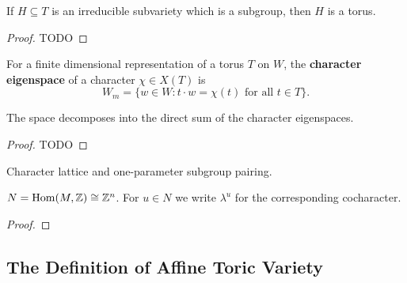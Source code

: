 \begin{proposition}[Proposition 1.1.1(b)]
  \label{1-1-1-subgroup-subtorus}

  If $H \subseteq T$ is an irreducible subvariety which is a subgroup, then $H$ is a torus.
\end{proposition}
\begin{proof}
  \uses{}

  TODO
\end{proof}


\begin{definition}
  \label{1-1-char-eigenspace}

  For a finite dimensional representation of a torus $T$ on $W$, the {\bf character eigenspace} of a character $\chi \in X(T)$ is
  \[
    W_m = \{w\in W : t\cdot w = \chi(t)\text{ for all } t\in T \}.
  \]
\end{definition}


\begin{proposition}
  \label{1-1-2-char-eigenspace-direct-sum}

  The space decomposes into the direct sum of the character eigenspaces.
\end{proposition}
\begin{proof}
  \uses{}

  TODO
\end{proof}


\begin{definition}
  \label{1-1-char-cochar-pairing}

  Character lattice and one-parameter subgroup pairing.
\end{definition}


\begin{proposition}
  \label{co1-1-char-torus}

  $N = \operatorname{Hom}(M, {\mathbb Z}) \cong  {\mathbb Z}^n$. For $u \in N$ we write $\lambda^u$ for the corresponding cocharacter.
\end{proposition}
\begin{proof}

\end{proof}


\subsection{The Definition of Affine Toric Variety}


